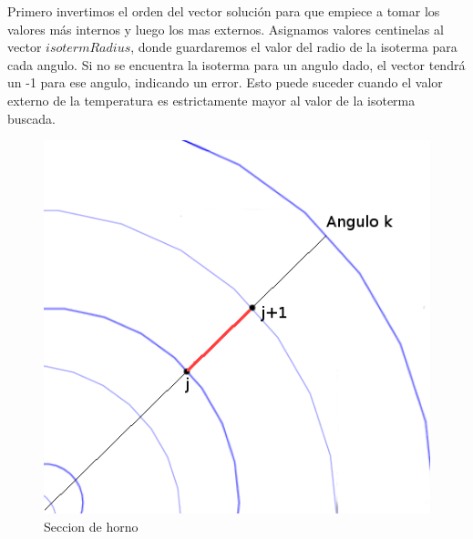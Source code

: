 Primero invertimos el orden del vector solución para que empiece a tomar los valores más internos y luego los mas externos. Asignamos valores centinelas al vector $isotermRadius$, donde guardaremos el valor del radio de la isoterma para cada angulo. Si no se encuentra la isoterma para un angulo dado, el vector tendrá un -1 para ese angulo, indicando un error. Esto puede suceder cuando el valor externo de la temperatura es estrictamente mayor al valor de la isoterma buscada. \\
\begin{figure}
  \vspace{-20pt}
  \begin{center}
    \includegraphics[scale= 0.6]{imagenes/radiosLimpio.png}
  \end{center}
  \vspace{-20pt}
  \caption{Seccion de horno}
  \vspace{-10pt}
  \label{fig:Exp3}
\end{figure}

